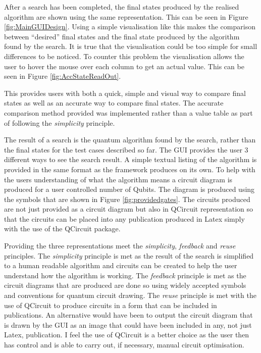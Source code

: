 After a search has been completed, the final states produced by the realised algorithm are shown using the same representation.
This can be seen in Figure \ref{fig:MainGUIDesign}.
Using a simple visualisation like this makes the comparison between ``desired'' final states and the final state produced by the algorithm found by the search.
It is true that the visualisation could be too simple for small differences to be noticed.
To counter this problem the visualisation allows the user to hover the mouse over each column to get an actual value.
This can be seen in Figure \ref{fig:AccStateReadOut}.

This provides users with both a quick, simple and visual way to compare final states as well as an accurate way to compare final states.
The accurate comparison method provided was implemented rather than a value table as part of following the \emph{simplicity} principle.

The result of a search is the quantum algorithm found by the search, rather than the final states for the test cases described so far.
The GUI provides the user 3 different ways to see the search result.
A simple textual listing of the algorithm is provided in the same format as the framework produces on its own.
To help with the users understanding of what the algorithm means a circuit diagram is produced for a user controlled number of Qubits.
The diagram is produced using the symbols that are shown in Figure \ref{fig:providedgates}.
The circuits produced are not just provided as a circuit diagram but also in QCircuit representation so that the circuits can be placed into any publication produced in Latex simply with the use of the QCircuit package.

Providing the three representations meet the \emph{simplicity}, \emph{feedback} and \emph{reuse} principles.
The \emph{simplicity} principle is met as the result of the search is simplified to a human readable algorithm and circuits can be created to help the user understand how the algorithm is working.
The \emph{feedback} principle is met as the circuit diagrams that are produced are done so using widely accepted symbols and conventions for quantum circuit drawing.
The \emph{reuse} principle is met with the use of QCircuit to produce circuits in a form that can be included in publications.
An alternative would have been to output the circuit diagram that is drawn by the GUI as an image that could have been included in any, not just Latex, publication.
I feel the use of QCircuit is a better choice as the user then has control and is able to carry out, if necessary, manual circuit optimisation.

